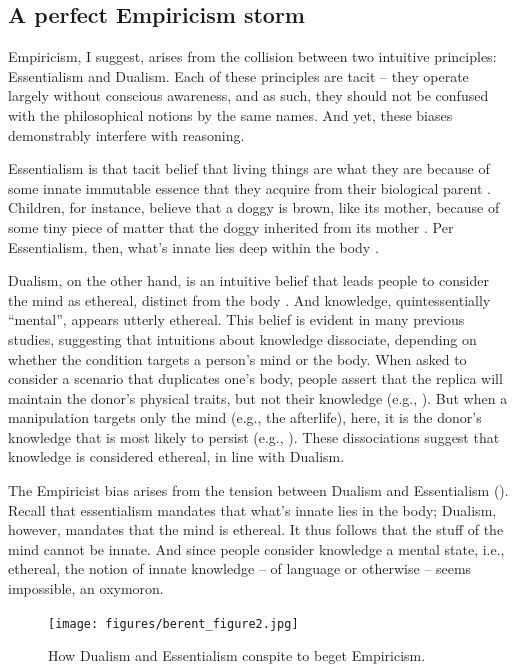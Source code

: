 \documentclass[output=paper,colorlinks,citecolor=brown
]{langscibook}
\begin{document}
\subsection{A perfect Empiricism storm}
Empiricism, I suggest, arises from the collision between two intuitive principles: Essentialism and Dualism. Each of these principles are tacit -- they operate largely without conscious awareness, and as such, they should not be confused with the philosophical notions by the same names. And yet, these biases demonstrably interfere with reasoning.

Essentialism is that tacit belief that living things are what they are because of some innate immutable essence that they acquire from their biological parent \citep{keil1986acquisition,gelman2003essential}. Children, for instance, believe that a doggy is brown, like its mother, because of some tiny piece of matter that the doggy inherited from its mother \citep{springer1991early}. Per Essentialism, then, what’s innate lies deep within the body \citep{springer1991early}.

Dualism, on the other hand, is an intuitive belief that leads people to consider the mind as ethereal, distinct from the body \citep{bloom2005descartes}. And knowledge, quintessentially ``mental'', appears utterly ethereal. This belief is evident in many previous studies, suggesting that intuitions about knowledge dissociate, depending on whether the condition targets a person’s mind or the body. When asked to consider a scenario that duplicates one’s body, people assert that the replica will maintain the donor’s physical traits, but not their knowledge (e.g., \cite{hood2012children}). But when a manipulation targets only the mind (e.g., the afterlife), here, it is the donor’s knowledge that is most likely to persist (e.g., \cite{bering2004natural}). These dissociations suggest that knowledge is considered ethereal, in line with Dualism.

The Empiricist bias arises from the tension between Dualism and Essentialism (). Recall that essentialism mandates that what’s innate lies in the body; Dualism, however, mandates that the mind is ethereal. It thus follows that the stuff of the mind cannot be innate. And since people consider knowledge a mental state, i.e., ethereal, the notion of innate knowledge -- of language or otherwise -- seems impossible, an oxymoron. 

\begin{figure}
    \centering
    \texttt{[image: figures/berent\_figure2.jpg]}
    \caption{How Dualism and Essentialism conspite to beget Empiricism. }
    \label{fig:figure2}
\end{figure}
\end{document}
